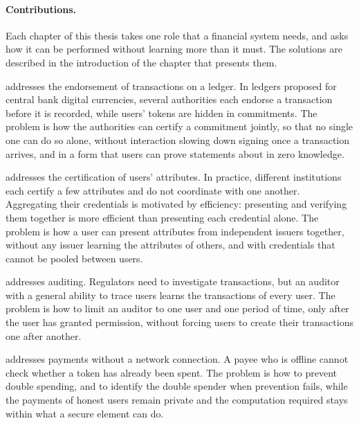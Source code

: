 \paragraph{Contributions.} Each chapter of this thesis takes one role that a
financial system needs, and asks how it can be performed without learning more
than it must. The solutions are described in the introduction of the chapter
that presents them.

 addresses the endorsement of transactions on a ledger. In
ledgers proposed for central bank digital currencies, several authorities each
endorse a transaction before it is recorded, while users' tokens are hidden in
commitments. The problem is how the authorities can certify a commitment
jointly, so that no single one can do so alone, without interaction slowing
down signing once a transaction arrives, and in a form that users can prove
statements about in zero knowledge.

 addresses the certification of users' attributes. In
practice, different institutions each certify a few attributes and do not
coordinate with one another. Aggregating their credentials is motivated by
efficiency: presenting and verifying them together is more efficient than
presenting each credential alone. The problem is how a user can present
attributes from independent issuers together, without any issuer learning the attributes
of others, and with credentials that cannot be pooled between users.

 addresses auditing. Regulators need to investigate
transactions, but an auditor with a general ability to trace users learns the
transactions of every user. The problem is how to limit an auditor to one user and
one period of time, only after the user has granted permission, without forcing
users to create their transactions one after another.

 addresses payments without a network connection.
A payee who is offline cannot check whether a token has already been spent. The
problem is how to prevent double spending, and to identify the double spender
when prevention fails, while the payments of honest users remain private and
the computation required stays within what a secure element can do.


